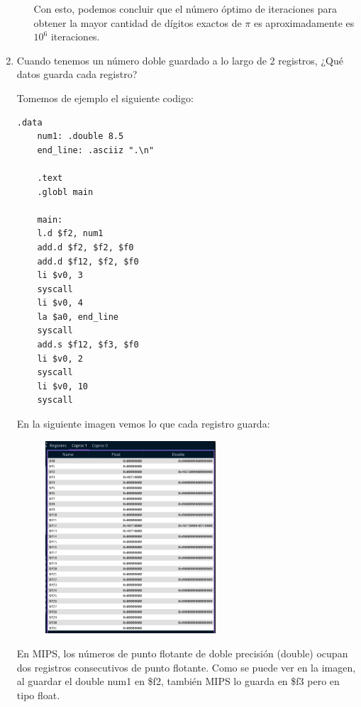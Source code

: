 \documentclass[12pt,letterpaper]{article}
\begin{document}
\begin{enumerate}
\begin{itemize}
    Con esto, podemos concluir que el número óptimo de iteraciones para obtener la mayor cantidad de dígitos exactos de $\pi$ es aproximadamente es $10^6$ iteraciones.
    
    
  \end{itemize}

  \bigskip

  \newpage
  
\item Cuando tenemos un número doble guardado a lo largo de 2 registros, ¿Qué datos guarda cada registro?
  \bigskip
  
  Tomemos de ejemplo el siguiente codigo:

  \begin{lstlisting}[style=mipsstyle, caption={Código en MIPS}]
    .data
    num1: .double 8.5
    end_line: .asciiz ".\n"
    
    .text
    .globl main
    
    main:
    l.d $f2, num1
    add.d $f2, $f2, $f0
    add.d $f12, $f2, $f0
    li $v0, 3
    syscall
    li $v0, 4
    la $a0, end_line
    syscall
    add.s $f12, $f3, $f0
    li $v0, 2
    syscall
    li $v0, 10
    syscall
  \end{lstlisting}

  En la siguiente imagen vemos lo que cada registro guarda:

  \begin{figure}[H]
    \centering
    \includegraphics[width=0.6\textwidth]{image.png}
  \end{figure}
  
  En MIPS, los números de punto flotante de doble precisión (double) ocupan dos registros consecutivos de punto flotante. Como se puede ver en la imagen, al guardar el double num1 en \$f2, también MIPS lo guarda en \$f3 pero en tipo float.
  

\end{enumerate}
\end{document}
